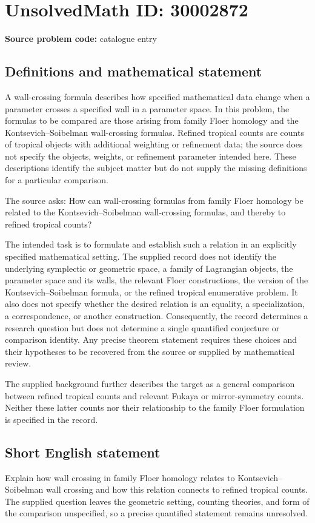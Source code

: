 \documentclass[11pt]{article}
\begin{document}
\section*{UnsolvedMath ID: 30002872}
\textbf{Source problem code:} catalogue entry
\subsection{Definitions and mathematical statement}
A wall-crossing formula describes how specified mathematical data change when a parameter crosses a specified wall in a parameter space. In this problem, the formulas to be compared are those arising from family Floer homology and the Kontsevich--Soibelman wall-crossing formulas. Refined tropical counts are counts of tropical objects with additional weighting or refinement data; the source does not specify the objects, weights, or refinement parameter intended here. These descriptions identify the subject matter but do not supply the missing definitions for a particular comparison.

The source asks: How can wall-crossing formulas from family Floer homology be related to the Kontsevich--Soibelman wall-crossing formulas, and thereby to refined tropical counts?

The intended task is to formulate and establish such a relation in an explicitly specified mathematical setting. The supplied record does not identify the underlying symplectic or geometric space, a family of Lagrangian objects, the parameter space and its walls, the relevant Floer constructions, the version of the Kontsevich--Soibelman formula, or the refined tropical enumerative problem. It also does not specify whether the desired relation is an equality, a specialization, a correspondence, or another construction. Consequently, the record determines a research question but does not determine a single quantified conjecture or comparison identity. Any precise theorem statement requires these choices and their hypotheses to be recovered from the source or supplied by mathematical review.

The supplied background further describes the target as a general comparison between refined tropical counts and relevant Fukaya or mirror-symmetry counts. Neither these latter counts nor their relationship to the family Floer formulation is specified in the record.
\subsection{Short English statement}
Explain how wall crossing in family Floer homology relates to Kontsevich--Soibelman wall crossing and how this relation connects to refined tropical counts. The supplied question leaves the geometric setting, counting theories, and form of the comparison unspecified, so a precise quantified statement remains unresolved.
\end{document}
